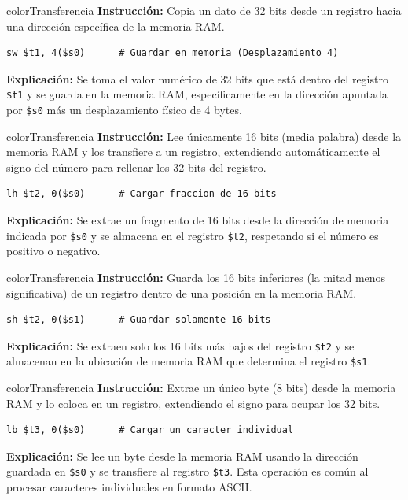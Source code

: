 \documentclass[12pt,a4paper]{article}
\begin{document}
\begin{instructionBox}{colorTransferencia}
\textbf{Instrucción:} Copia un dato de 32 bits desde un registro hacia una dirección específica de la memoria RAM.
\begin{lstlisting}
sw $t1, 4($s0)      # Guardar en memoria (Desplazamiento 4)
\end{lstlisting}
\textbf{Explicación:} Se toma el valor numérico de 32 bits que está dentro del registro \texttt{\$t1} y se guarda en la memoria RAM, específicamente en la dirección apuntada por \texttt{\$s0} más un desplazamiento físico de 4 bytes.
\end{instructionBox}

\begin{instructionBox}{colorTransferencia}
\textbf{Instrucción:} Lee únicamente 16 bits (media palabra) desde la memoria RAM y los transfiere a un registro, extendiendo automáticamente el signo del número para rellenar los 32 bits del registro.
\begin{lstlisting}
lh $t2, 0($s0)      # Cargar fraccion de 16 bits
\end{lstlisting}
\textbf{Explicación:} Se extrae un fragmento de 16 bits desde la dirección de memoria indicada por \texttt{\$s0} y se almacena en el registro \texttt{\$t2}, respetando si el número es positivo o negativo.
\end{instructionBox}

\begin{instructionBox}{colorTransferencia}
\textbf{Instrucción:} Guarda los 16 bits inferiores (la mitad menos significativa) de un registro dentro de una posición en la memoria RAM.
\begin{lstlisting}
sh $t2, 0($s1)      # Guardar solamente 16 bits
\end{lstlisting}
\textbf{Explicación:} Se extraen solo los 16 bits más bajos del registro \texttt{\$t2} y se almacenan en la ubicación de memoria RAM que determina el registro \texttt{\$s1}.
\end{instructionBox}

\begin{instructionBox}{colorTransferencia}
\textbf{Instrucción:} Extrae un único byte (8 bits) desde la memoria RAM y lo coloca en un registro, extendiendo el signo para ocupar los 32 bits.
\begin{lstlisting}
lb $t3, 0($s0)      # Cargar un caracter individual
\end{lstlisting}
\textbf{Explicación:} Se lee un byte desde la memoria RAM usando la dirección guardada en \texttt{\$s0} y se transfiere al registro \texttt{\$t3}. Esta operación es común al procesar caracteres individuales en formato ASCII.
\end{instructionBox}
\end{document}
